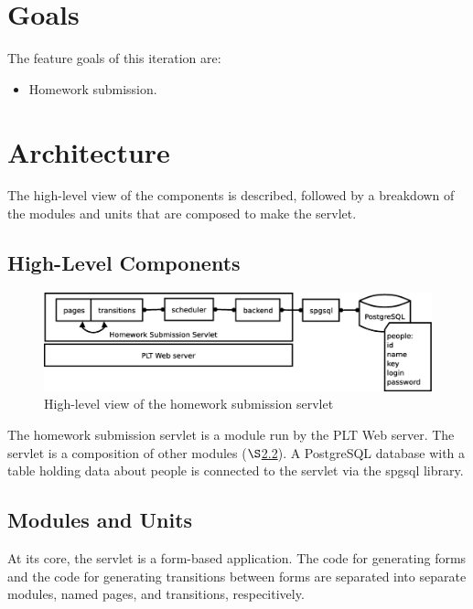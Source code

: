 \documentclass[a4paper]{article}
\begin{document}
\section{Goals}\label{sec:goals}

The feature goals of this iteration are:

\begin{itemize}
\item{Homework submission.}
\end{itemize}

\section{Architecture}\label{sec:arch}

The high-level view of the components is described, followed by a breakdown of
the modules and units that are composed to make the servlet.

\subsection{High-Level Components}\label{subsec:high-level}

\begin{figure}[ht]
\centering
\includegraphics[scale=.35]{architecture.eps}
\caption{High-level view of the homework submission servlet}
\label{fig:architecture}
\end{figure}

The homework submission servlet is a module run by the PLT Web server. The
servlet is a composition of other modules ($\S$\ref{subsec:components}). A
PostgreSQL database with a table holding data about people is connected to the
servlet via the spgsql library.

\subsection{Modules and Units}\label{subsec:components}

At its core, the servlet is a form-based application. The code for generating 
forms and the code for generating transitions between forms are separated into 
separate modules, named pages, and transitions, respecitively.
\end{document}
